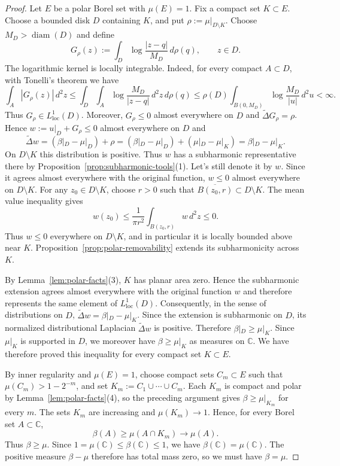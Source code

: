 \documentclass[10pt,reqno]{amsart}
\theoremstyle{remark}
\newcommand{\C}{\mathbb C}
\begin{document}
\begin{proof}
    Let $E$ be a polar Borel set with $\mu(E)=1$. Fix a compact set $K\subset E$. Choose a bounded disk $D$ containing $K$, and put $\rho:=\mu|_{D\setminus K}$. Choose $M_D>\operatorname{diam}(D)$ and define
    \[G_\rho(z):=\int_D\log\frac{|z-q|}{M_D}\, d\rho(q),\qquad z\in D.\]
    The logarithmic kernel is locally integrable. Indeed, for every compact $A\subset D$, with Tonelli's theorem we have
    \[\int_A|G_\rho(z)|\,d^2z
    \le \int_D\int_A\log\frac{M_D}{|z-q|}\,d^2z\,d\rho(q)
    \le \rho(D)\int_{B(0,M_D)} \log\frac{M_D}{|u|}\,d^2u
    <\infty.\]
    Thus $G_\rho\in L^1_{\mathrm{loc}}(D)$. Moreover, $G_\rho\le 0$ almost everywhere on $D$ and $\widetilde{\Delta}G_\rho=\rho$. Hence $w:=u|_D+G_\rho\le 0$ almost everywhere on $D$ and 
    \[\widetilde{\Delta}w=(\beta|_D-\mu|_D)+\rho=(\beta|_D-\mu|_D)+(\mu|_D-\mu|_K)=\beta|_D-\mu|_K.\]
    On $D\setminus K$ this distribution is positive. Thus $w$ has a subharmonic representative there by Proposition~\ref{prop:subharmonic-tools}(1). Let's still denote it by $w$. Since it agrees almost everywhere with the original function, $w\le0$ almost everywhere on $D\setminus K$. For any $z_0\in D\setminus K$, choose $r>0$ such that $\overline{B(z_0,r)}\subset D\setminus K$. The mean value inequality gives
    \[w(z_0)\le\frac1{\pi r^2}\int_{B(z_0,r)}w\,d^2z \le 0.\]
    Thus $w\le0$ everywhere on $D\setminus K$, and in particular it is locally bounded above near $K$. Proposition~\ref{prop:polar-removability} extends its subharmonicity across $K$.

    By Lemma~\ref{lem:polar-facts}(3), $K$ has planar area zero. Hence the subharmonic extension agrees almost everywhere with the original function $w$ and therefore represents the same element of $L^1_{\mathrm{loc}}(D)$. Consequently, in the sense of distributions on $D$, $\widetilde{\Delta}w=\beta|_D-\mu|_K$. Since the extension is subharmonic on $D$, its normalized distributional Laplacian $\widetilde{\Delta}w$ is positive. Therefore $\beta|_D\ge\mu|_K$. Since $\mu|_K$ is supported in $D$, we moreover have $\beta\ge\mu|_K$ as measures on $\C$. We have therefore proved this inequality for every compact set $K\subset E$.

    By inner regularity and $\mu(E)=1$, choose compact sets $C_m\subset E$ such that $\mu(C_m)>1-2^{-m}$, and set $K_m:=C_1\cup\cdots\cup C_m$. Each $K_m$ is compact and polar by Lemma~\ref{lem:polar-facts}(4), so the preceding argument gives $\beta\ge\mu|_{K_m}$ for every $m$. The sets $K_m$ are increasing and $\mu(K_m)\to1$. Hence, for every Borel set $A\subset\C$,
    \[\beta(A)\ge\mu(A\cap K_m)\longrightarrow\mu(A).\]
    Thus $\beta\ge\mu$. Since $1=\mu(\C)\le\beta(\C)\le1$, we have $\beta(\C)=\mu(\C)$. The positive measure $\beta-\mu$ therefore has total mass zero, so we must have $\beta=\mu$.
\end{proof}
\end{document}
